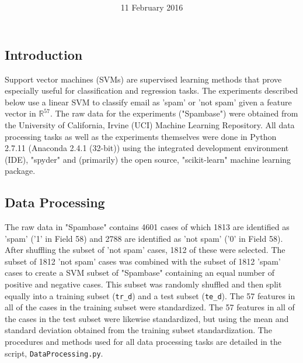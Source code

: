 \documentclass[12pt]{article}
\title{
\vspace{2in}
\textmd{\textbf{\hmwkTitle}}\\
\textit{\normalsize \hmwkClass}
\vspace{3in}
}
\author{\textbf{\hmwkAuthorName}}
\date{11 February 2016} %
\begin{document}
\maketitle
\thispagestyle{empty}
\clearpage\maketitle

\subsection{Introduction}
Support vector machines (SVMs) are supervised learning methods that prove especially useful for classification and regression tasks. The experiments described below use a linear SVM to classify email as 'spam' or 'not spam' given a feature vector in $ \mathbb{R}^{57}$. The raw data for the experiments ("Spambase") were obtained from the University of California, Irvine (UCI) Machine Learning Repository. All data processing tasks as well as the experiments themselves were done in Python 2.7.11 (Anaconda 2.4.1 (32-bit)) using the integrated development environment (IDE), "spyder" and (primarily) the open source, "scikit-learn" machine learning package.\\

\subsection{Data Processing}
The raw data in "Spambase" contains 4601 cases of which 1813 are identified as 'spam' ('1' in Field 58) and 2788 are identified as 'not spam' ('0' in Field 58). After shuffling the subset of 'not spam' cases, 1812 of these were selected. The subset of 1812 'not spam' cases was combined with the subset of 1812 'spam' cases to create a SVM subset of "Spambase" containing an equal number of positive and negative cases. This subset was randomly shuffled and then split equally into a training subset (\verb|tr_d|) and a test subset (\verb|te_d|). The 57 features in all of the cases in the training subset were standardized. The 57 features in all of the cases in the test subset were likewise standardized, but using the mean and standard deviation obtained from the training subset standardization. The procedures and methods used for all data processing tasks are detailed in the script, \verb|DataProcessing.py|.
\end{document}
